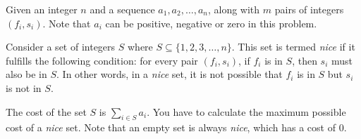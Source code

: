 Given an integer $n$ and a sequence $a_1, a_2, \ldots, a_n$, along with $m$ pairs of integers $(f_i, s_i)$.
Note that $a_i$ can be positive, negative or zero in this problem.

Consider a set of integers $S$ where $S \subseteq \{1, 2, 3, \ldots, n\}$.
This set is termed \textit{nice} if it fulfills the following condition:
for every pair $(f_i, s_i)$, if $f_i$ is in $S$, then $s_i$ must also be in $S$.
In other words, in a \textit{nice} set, it is not possible that $f_i$ is in $S$ but $s_i$ is not in $S$.

The cost of the set $S$ is $\sum_{i \in S} a_i$.
You have to calculate the maximum possible cost of a \textit{nice} set.
Note that an empty set is always \textit{nice}, which has a cost of $0$. 